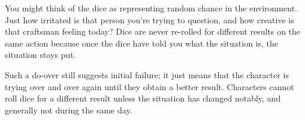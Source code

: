 \begin{multicols}{2}
You might think of the dice as representing random chance in the environment. Just how irritated is that person you're trying to question, and how creative is that craftsman feeling today? Dice are never re-rolled for different results on the same action because once the dice have told you what the situation is, the situation stays put.

Such a do-over still suggests initial failure; it just means that the character is trying over and over again until they obtain a better result.
Characters cannot roll dice for a different result unless the situation has changed notably, and generally not during the same day.

\end{multicols}

\section{}
\label{weight}

